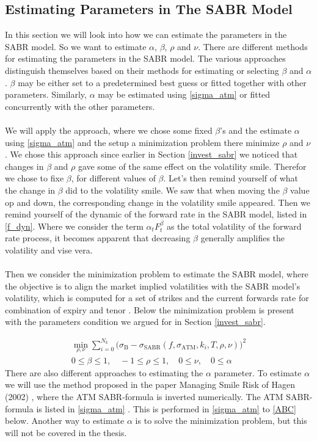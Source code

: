 \subsection{Estimating Parameters in The SABR Model} \label{est_parm_sabr}
In this section we will look into how we can estimate the parameters in the SABR model.
So we want to estimate $\alpha$, $\beta$, $\rho$ and $\nu$.       
There are different methods for estimating the parameters in the SABR model. 
The various approaches distinguish themselves based on their methods for estimating or selecting $\beta$ and $\alpha$.
$\beta$ may be either set to a predetermined best guess or fitted together with other parameters.
Similarly, $\alpha$ may be estimated using \autoref{sigma_atm} or fitted concurrently with the other parameters.
\\\\
We will apply the approach, where we chose some fixed $\beta$'s and the estimate $\alpha$ using \autoref{sigma_atm}  and the
setup a minimization problem there minimize $\rho$ and $\nu$. We chose this approach since earlier in Section \ref{invest_sabr}
we noticed that changes in $\beta$ and $\rho$ gave some of the same effect on the volatility smile. Therefor we chose to fixe  $\beta$, for different
values of $\beta$. Let's then remind yourself of what the change in $\beta$ did to the volatility smile.
We saw that when moving the $\beta$ value op and down, the corresponding change in the volatility smile appeared. 
Then we remind yourself of the dynamic of the forward rate in the SABR model, listed in \autoref{f_dyn}. 
Where we consider the term  $\alpha_t F_t^\beta$ as the total volatility of the forward rate process,
it becomes apparent that decreasing $\beta$ generally amplifies the volatility and vise vera. 
\\\\
Then we consider the minimization problem to estimate the SABR model, where the objective is to align
the market implied volatilities with the SABR model's volatility, which is computed for a 
set of strikes and the current forwards rate for combination of expiry and tenor \cite{Lindstrom}. 
Below the minimization problem is present with the parameters condition we argued for in Section \ref{invest_sabr}.
 
\begin{align}
   \min_{\rho, \nu} \sum_{i=0}^{N_k} \Big(\sigma_{\text{B}} - 
    \sigma_{\text{SABR}}(f, \sigma_{\text{ATM}}, k_i, T, \rho, \nu)\Big)^2 \\
    0 \leq \beta \leq 1, \quad -1 \leq \rho \leq 1, \quad 0 \leq \nu, \quad 0 \leq \alpha
\end{align}
There are also different approaches to estimating the $\alpha$ parameter.
To estimate $\alpha$ we will use the method proposed in the paper Managing Smile Risk 
of Hagen (2002) \cite{Smile},
where the ATM SABR-formula is inverted numerically. The ATM SABR-formula is listed in \autoref{sigma_atm} \cite{Smile}.
This is performed in \autoref{sigma_atm} to \autoref{ABC} below.
Another way to estimate $\alpha$ is to solve the 
minimization problem, but this will not be covered in the thesis.

